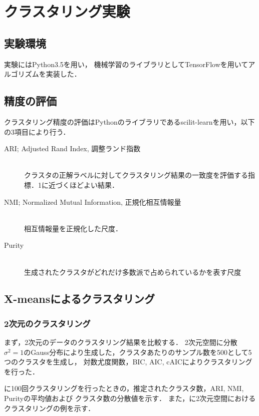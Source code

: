\section{クラスタリング実験}

\subsection{実験環境}
実験にはPython3.5を用い，
機械学習のライブラリとしてTensorFlowを用いてアルゴリズムを実装した．

\subsection{精度の評価}
クラスタリング精度の評価はPythonのライブラリであるscilit-learnを用い，以下の3項目により行う．
\begin{description}
  \item[ARI; Adjusted Rand Index, 調整ランド指数]~\\
    クラスタの正解ラベルに対してクラスタリング結果の一致度を評価する指標．1に近づくほどよい結果．
  \item[NMI; Normalized Mutual Information, 正規化相互情報量]~\\
    相互情報量を正規化した尺度．
  \item[Purity]~\\
    生成されたクラスタがどれだけ多数派で占められているかを表す尺度
\end{description}

\subsection{X-meansによるクラスタリング}
\subsubsection{2次元のクラスタリング}

まず，2次元のデータのクラスタリング結果を比較する．
2次元空間に分散$\sigma^2=1$のGauss分布により生成した，クラスタあたりのサンプル数を500として5つのクラスタを生成し，
対数尤度関数，BIC, AIC, cAICによりクラスタリングを行った．

に100回クラスタリングを行ったときの，推定されたクラスタ数，ARI, NMI, Purityの平均値および
クラスタ数の分散値を示す．
また，に2次元空間におけるクラスタリングの例を示す．

